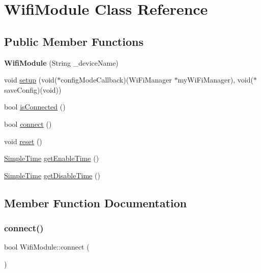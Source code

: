 \hypertarget{class_wifi_module}{}\section{Wifi\+Module Class Reference}
\label{class_wifi_module}
\subsection*{Public Member Functions}
\begin{DoxyCompactItemize}
\item 
\mbox{\label{class_wifi_module_a1fad662191ce40056868f0a21d0b1ef0}} 
{\bfseries Wifi\+Module} (String \+\_\+device\+Name)
\item 
void \mbox{\hyperlink{class_wifi_module_a78a8fa5090dc159e070d32c957e661dd}{setup}} (void($\ast$config\+Mode\+Callback)(Wi\+Fi\+Manager $\ast$my\+Wi\+Fi\+Manager), void($\ast$save\+Config)(void))
\item 
bool \mbox{\hyperlink{class_wifi_module_a0f9b83f8ed9714183df33e055323261f}{is\+Connected}} ()
\item 
bool \mbox{\hyperlink{class_wifi_module_a408a6374602360051d2791de4f56b067}{connect}} ()
\item 
void \mbox{\hyperlink{class_wifi_module_af03089b54800669d9cc57d3ac8bf3188}{reset}} ()
\item 
\mbox{\hyperlink{class_simple_time}{Simple\+Time}} \mbox{\hyperlink{class_wifi_module_a1082a8799fe84e825520a61ee048da46}{get\+Enable\+Time}} ()
\item 
\mbox{\hyperlink{class_simple_time}{Simple\+Time}} \mbox{\hyperlink{class_wifi_module_ae43e1f85630c40920fa87c12de0d8e1e}{get\+Disable\+Time}} ()
\end{DoxyCompactItemize}


\subsection{Member Function Documentation}
\mbox{\label{class_wifi_module_a408a6374602360051d2791de4f56b067}} 
\subsubsection{\texorpdfstring{connect()}{connect()}}
{\footnotesize\ttfamily bool Wifi\+Module\+::connect (\begin{DoxyParamCaption}{ }\end{DoxyParamCaption})}


